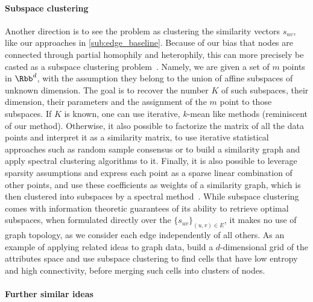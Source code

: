 \paragraph{Subspace clustering}
\label{par:erw_subs}

Another direction is to see the problem as clustering the similarity vectors $s_{uv}$, like our
approaches in \autoref{sub:edge_baseline}. Because of
our bias that nodes are connected through partial homophily and heterophily, this can more precisely
be casted as a subspace clustering problem~\autocite{SCSurvey11}. Namely, we are given a set of $m$
points in $\Rbb^d$, with the assumption they belong to the union of affine subspaces of unknown
dimension. The goal is to recover the number $K$ of such subspaces, their dimension, their
parameters and the assignment of the $m$ point to those subspaces. If $K$ is known, one can use
iterative, $k$-mean like methods (reminiscent of our \lloyd{} method). Otherwise, it also possible to
factorize the matrix of all the data points and interpret it as a similarity matrix, to use iterative
statistical approaches such as random sample consensus or to build a similarity graph and apply
spectral clustering algorithms to it. Finally, it is also possible to leverage sparsity assumptions and
express each point as a sparse linear combination of other points, and use these coefficients as
weights of a similarity graph, which is then clustered into subspaces by a spectral
method~\autocite{SparseSC13}.
While subspace clustering comes with information theoretic guarantees of its ability to retrieve
optimal subspaces, when formulated directly over the $\{s_{uv}\}_{(u,v) \in E}$, it makes no use of
graph topology, as we consider each edge independently of all others. As an example of applying
related ideas to graph data, \textcite{Huang2015} build a $d$-dimensional grid of the attributes
space and use subspace clustering to find cells that have low entropy and high connectivity, before
merging such cells into clusters of nodes.

\paragraph{Further similar ideas}
\label{par:erw_misc}


